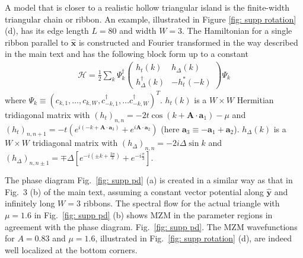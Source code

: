\documentclass[aps,prb,showpacs,amsmath,amssymb,superscriptaddress]{revtex4-2}
\let\oldhat\hat
\renewcommand{\hat}[1]{\oldhat{\mathbf{#1}}}
\newcommand{\ham}{\mathcal{H}}
\newcommand{\de}{\Delta}
\begin{document}
A model that is closer to a realistic hollow triangular island is the finite-width triangular chain or ribbon. An example, illustrated in Figure \ref{fig: supp rotation} (d), has its edge length $L=80$ and width $W=3$. The Hamiltonian for a single ribbon parallel to $\hat{x}$ is constructed and Fourier transformed in the way described in the main text and has the following block form up to a constant
\begin{eqnarray}\label{eq:Hribbon}
      \ham = \frac{1}{2} \sum_k \Psi_k^\dagger \left(
    \begin{matrix}
      h_t(k) & h_\Delta(k) \\
      h_\Delta^\dagger(k) & -h_t^*(-k)
    \end{matrix} \right)
    \Psi_k
\end{eqnarray}
where $\Psi_k \equiv (c_{k,1},\dots, c_{k,W},c^\dag_{-k,1},\dots c_{-k,W}^\dag)^T$. $h_t(k)$ is a $W\times W$ Hermitian tridiagonal matrix with $(h_t)_{n,n} = -2t\cos(k+\mathbf A\cdot \mathbf a_1) - \mu$ and $(h_t)_{n,n+1} = -t\left( e^{i(-k+\mathbf A\cdot \mathbf a_3)}  + e^{i\mathbf A \cdot \mathbf a_2}\right)$ (here $\mathbf a_3 \equiv -\mathbf a_1 + \mathbf a_2$). $h_\Delta(k)$ is a $W\times W$ tridiagonal matrix with $(h_\Delta)_{n,n} = -2i\de \sin k $ and $(h_\Delta)_{n,n\pm 1} = \mp \de\left[ e^{-i(\pm k + \frac{2\pi}{3})} + e^{-i\frac{\pi}{3}} \right]$.

The phase diagram Fig.~\ref{fig: supp pd} (a) is created in a similar way as that in Fig.~3 (b) of the main text, assuming a constant vector potential along $\hat{y}$ and infinitely long $W=3$ ribbons. The spectral flow for the actual triangle with $\mu = 1.6$ in Fig.~\ref{fig: supp pd} (b) shows MZM in the parameter regions in agreement with the phase diagram. Fig.~\ref{fig: supp pd}. The MZM wavefunctions for $A=0.83$ and $\mu=1.6$, illustrated in Fig.~\ref{fig: supp rotation} (d), are indeed well localized at the bottom corners.
\end{document}
